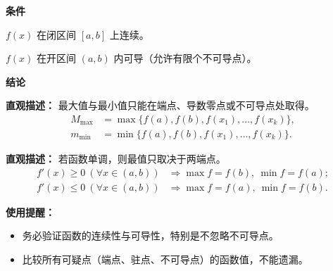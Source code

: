 \begin{statementbox}
	\textbf{\textcolor{CStatement}{条件}}
	\begin{description}[style=nextline, leftmargin=2.8em, labelsep=0.5em, itemsep=0.35em]
		\item[\textbf{\textcolor{CStatement}{条件1（函数连续性）：}}]
			$f(x)$ 在闭区间 $[a,b]$ 上连续。
		\item[\textbf{\textcolor{CStatement}{条件2（可导条件）：}}]
			$f(x)$ 在开区间 $(a,b)$ 内可导（允许有限个不可导点）。
	\end{description}
	\textbf{\textcolor{CStatement}{结论}}
	\begin{description}[style=nextline, leftmargin=2.8em, labelsep=0.5em, itemsep=0.45em]
		\item[\textbf{\textcolor{CStatement}{结论一（最值点确定）：}}]
			\textbf{\textcolor{CStatement}{直观描述：}}
			最大值与最小值只能在端点、导数零点或不可导点处取得。
			\[
				\begin{aligned}
					M_{\max} &= \max\{f(a), f(b), f(x_1),\dots,f(x_k)\},\\ m_{\min} &= \min\{f(a), f(b), f(x_1),\dots,f(x_k)\}.
			\end{aligned}
			\]
		\item[\textbf{\textcolor{CStatement}{推广结论（单调性简化）：}}]
			\textbf{\textcolor{CStatement}{直观描述：}}
			若函数单调，则最值只取决于两端点。
			\[
				\begin{aligned}
					f'(x)\ge0\ (\forall x\in(a,b)) &\Longrightarrow \max f = f(b),\ \min f = f(a);\\ f'(x)\le0\ (\forall x\in(a,b)) &\Longrightarrow \max f = f(a),\ \min f = f(b).
			\end{aligned}
			\]
	\end{description}
	\textbf{\textcolor{CStatement}{使用提醒：}}
	\begin{itemize}[leftmargin=*, itemsep=0.5em, topsep=0.4em]
		\item 务必验证函数的连续性与可导性，特别是不忽略不可导点。
		\item 比较所有可疑点（端点、驻点、不可导点）的函数值，不能遗漏。
	\end{itemize}

\end{statementbox}
